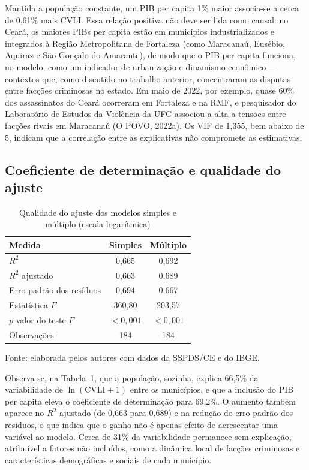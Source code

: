 \documentclass[12pt,a4paper]{article}
\newcommand{\fonte}[1]{
	\vspace{-2mm}
	\begin{center}\footnotesize Fonte: #1\end{center}
}
\newcommand{\fontedados}{elaborada pelos autores com dados da SSPDS/CE e do IBGE.}
\begin{document}
	Mantida a população constante, um PIB per capita 1\% maior associa-se a cerca de 0,61\% mais CVLI. Essa relação positiva não deve ser lida como causal: no Ceará, os maiores PIBs per capita estão em municípios industrializados e integrados à Região Metropolitana de Fortaleza (como Maracanaú, Eusébio, Aquiraz e São Gonçalo do Amarante), de modo que o PIB per capita funciona, no modelo, como um indicador de urbanização e dinamismo econômico --- contextos que, como discutido no trabalho anterior, concentraram as disputas entre facções criminosas no estado. Em maio de 2022, por exemplo, quase 60\% dos assassinatos do Ceará ocorreram em Fortaleza e na RMF, e pesquisador do Laboratório de Estudos da Violência da UFC associou a alta a tensões entre facções rivais em Maracanaú (O POVO, 2022a). Os VIF de 1,355, bem abaixo de 5, indicam que a correlação entre as explicativas não compromete as estimativas.
	
	\subsection{Coeficiente de determinação e qualidade do ajuste}
	
	\begin{table}[H]
		\centering
		\caption{Qualidade do ajuste dos modelos simples e múltiplo (escala logarítmica)}
		\label{tab:ajuste}
		\begin{tabular}{lcc}
			\toprule
			\textbf{Medida} & \textbf{Simples} & \textbf{Múltiplo} \\
			\midrule
			$R^2$                        & 0,665 & 0,692 \\
			$R^2$ ajustado               & 0,663 & 0,689 \\
			Erro padrão dos resíduos     & 0,694 & 0,667 \\
			Estatística $F$              & 360,80 & 203,57 \\
			$p$-valor do teste $F$       & $<0{,}001$ & $<0{,}001$ \\
			Observações                  & 184 & 184 \\
			\bottomrule
		\end{tabular}
	\end{table}
	\fonte{\fontedados}
	
	Observa-se, na Tabela~\ref{tab:ajuste}, que a população, sozinha, explica 66,5\% da variabilidade de $\ln(\text{CVLI}+1)$ entre os municípios, e que a inclusão do PIB per capita eleva o coeficiente de determinação para 69,2\%. O aumento também aparece no $R^2$ ajustado (de 0,663 para 0,689) e na redução do erro padrão dos resíduos, o que indica que o ganho não é apenas efeito de acrescentar uma variável ao modelo. Cerca de 31\% da variabilidade permanece sem explicação, atribuível a fatores não incluídos, como a dinâmica local de facções criminosas e características demográficas e sociais de cada município.
	
\end{document}
